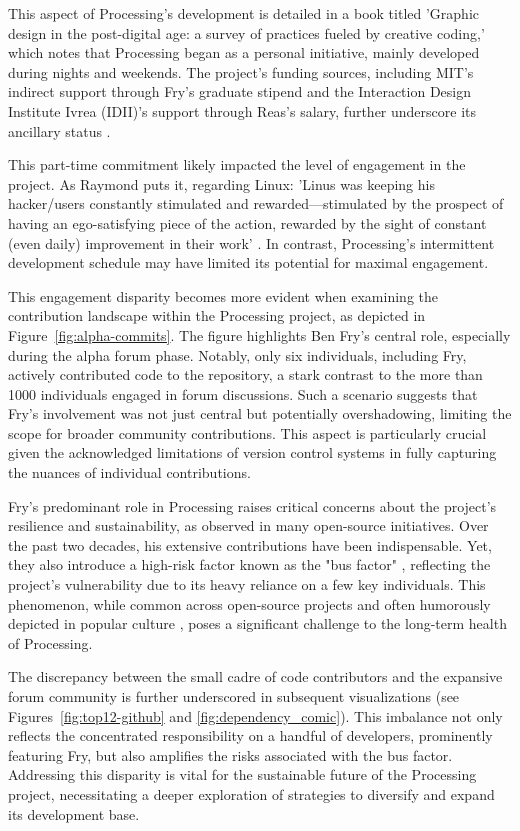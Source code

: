 This aspect of Processing's development is detailed in a book titled 'Graphic design in the post-digital age: a survey of practices fueled by creative coding,' which notes that Processing began as a personal initiative, mainly developed during nights and weekends. The project's funding sources, including MIT's indirect support through Fry's graduate stipend and the Interaction Design Institute Ivrea (IDII)'s support through Reas's salary, further underscore its ancillary status \parencite[396]{conradGraphicDesignPostdigital2021}.

This part-time commitment likely impacted the level of engagement in the project. As Raymond puts it, regarding Linux: 'Linus was keeping his hacker/users constantly stimulated and rewarded—stimulated by the prospect of having an ego-satisfying piece of the action, rewarded by the sight of constant (even daily) improvement in their work' \parencite[28]{raymondCathedralBazaar1999}. In contrast, Processing's intermittent development schedule may have limited its potential for maximal engagement.

This engagement disparity becomes more evident when examining the contribution landscape within the Processing project, as depicted in Figure~\ref{fig:alpha-commits}. The figure highlights Ben Fry's central role, especially during the alpha forum phase. Notably, only six individuals, including Fry, actively contributed code to the repository, a stark contrast to the more than 1000 individuals engaged in forum discussions. Such a scenario suggests that Fry's involvement was not just central but potentially overshadowing, limiting the scope for broader community contributions. This aspect is particularly crucial given the acknowledged limitations of version control systems in fully capturing the nuances of individual contributions.

Fry's predominant role in Processing raises critical concerns about the project's resilience and sustainability, as observed in many open-source initiatives. Over the past two decades, his extensive contributions have been indispensable. Yet, they also introduce a high-risk factor known as the "bus factor" \parencite{BusFactor2023}, reflecting the project's vulnerability due to its heavy reliance on a few key individuals. This phenomenon, while common across open-source projects and often humorously depicted in popular culture \parencite{munroeDependency2020}, poses a significant challenge to the long-term health of Processing.

The discrepancy between the small cadre of code contributors and the expansive forum community is further underscored in subsequent visualizations (see Figures~\ref{fig:top12-github} and \ref{fig:dependency_comic}). This imbalance not only reflects the concentrated responsibility on a handful of developers, prominently featuring Fry, but also amplifies the risks associated with the bus factor. Addressing this disparity is vital for the sustainable future of the Processing project, necessitating a deeper exploration of strategies to diversify and expand its development base.

